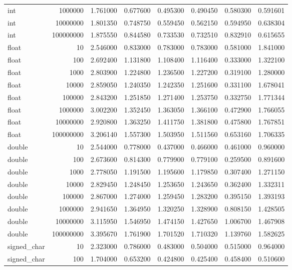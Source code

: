 \documentclass[12pt,fontset=none]{ctexart}
\begin{document}
{\begin{longtable}[]{@{}lrrrrrrr@{}}
int & 1000000 & 1.761000 & 0.677600 & 0.495300 & 0.490450 & 0.580300 &
0.591601 \\
int & 10000000 & 1.801350 & 0.748750 & 0.559450 & 0.562150 & 0.594950 &
0.638304 \\
int & 100000000 & 1.875550 & 0.844580 & 0.733530 & 0.732510 & 0.832910 &
0.615655 \\
float & 10 & 2.546000 & 0.833000 & 0.783000 & 0.783000 & 0.581000 &
1.841000 \\
float & 100 & 2.692400 & 1.131800 & 1.108400 & 1.116400 & 0.333000 &
1.322100 \\
float & 1000 & 2.803900 & 1.224800 & 1.236500 & 1.227200 & 0.319100 &
1.280000 \\
float & 10000 & 2.859050 & 1.240350 & 1.242350 & 1.251600 & 0.331100 &
1.678041 \\
float & 100000 & 2.843200 & 1.251850 & 1.271400 & 1.253750 & 0.332750 &
1.771344 \\
float & 1000000 & 3.002200 & 1.352450 & 1.363050 & 1.366100 & 0.472900 &
1.766055 \\
float & 10000000 & 2.920800 & 1.363250 & 1.411750 & 1.381800 & 0.475800
& 1.767851 \\
float & 100000000 & 3.206140 & 1.557300 & 1.503950 & 1.511560 & 0.653160
& 1.706335 \\
double & 10 & 2.544000 & 0.778000 & 0.437000 & 0.466000 & 0.461000 &
0.960000 \\
double & 100 & 2.673600 & 0.814300 & 0.779900 & 0.779100 & 0.259500 &
0.891600 \\
double & 1000 & 2.778050 & 1.191500 & 1.195600 & 1.179850 & 0.307400 &
1.271150 \\
double & 10000 & 2.829450 & 1.248450 & 1.253650 & 1.243650 & 0.362400 &
1.332311 \\
double & 100000 & 2.867000 & 1.274000 & 1.259450 & 1.283200 & 0.395150 &
1.393193 \\
double & 1000000 & 2.941650 & 1.364950 & 1.320250 & 1.328900 & 0.808150
& 1.428505 \\
double & 10000000 & 3.115950 & 1.546950 & 1.474150 & 1.427650 & 1.006700
& 1.467908 \\
double & 100000000 & 3.395670 & 1.761900 & 1.701520 & 1.710320 &
1.139760 & 1.582625 \\
signed\_char & 10 & 2.323000 & 0.786000 & 0.483000 & 0.504000 & 0.515000
& 0.964000 \\
signed\_char & 100 & 1.704000 & 0.653200 & 0.424800 & 0.425400 &
0.458400 & 0.510600 \\

\end{longtable}}
\end{document}
